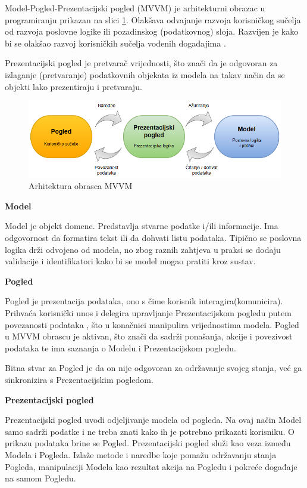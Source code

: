 \documentclass[times, utf8, diplomski]{fer}
\begin{document}
Model-Pogled-Prezentacijski pogled (MVVM) je arhitekturni obrazac u programiranju prikazan na slici \ref{fig:mvvm}. Olakšava odvajanje razvoja korisničkog sučelja od razvoja poslovne logike ili pozadinskog (podatkovnog) sloja. Razvijen je kako bi se olakšao razvoj korisničkih sučelja vođenih događajima . 

Prezentacijski pogled je pretvarač vrijednosti, što znači da je odgovoran za izlaganje (pretvaranje) podatkovnih objekata iz modela na takav način da se objekti lako prezentiraju i pretvaraju. \citep{mvvm}

\begin{figure}[htb]
\centering
\includegraphics[width=14cm]{mvvm.png}
\caption{Arhitektura obrasca MVVM}
\label{fig:mvvm}
\end{figure}


\textbf{Model}

Model je objekt domene. Predstavlja stvarne podatke i/ili informacije. Ima odgovornost da formatira tekst ili da dohvati listu podataka. Tipično se poslovna logika drži odvojeno od modela, no zbog raznih zahtjeva u praksi se dodaju validacije i identifikatori kako bi se model mogao pratiti kroz sustav. \citep{mvvm}


\hfill\break
\textbf{Pogled}

Pogled je prezentacija podataka, ono s čime korisnik interagira(komunicira). 
Prihvaća korisnički unos i delegira upravljanje Prezentacijskom pogledu putem povezanosti podataka , što u konačnici manipulira vrijednostima modela.
Pogled u MVVM obrascu je aktivan, što znači da sadrži ponašanja, akcije i povezivost podataka  te ima saznanja o Modelu i Prezentacijskom pogledu.

Bitna stvar za Pogled je da on nije odgovoran za održavanje svojeg stanja, već ga sinkronizira s Prezentacijskim pogledom. \citep{mvvm}


\hfill\break
\textbf{Prezentacijski pogled}

Prezentacijski pogled uvodi odjeljivanje modela od pogleda. Na ovaj način Model samo sadrži podatke i ne treba znati kako ih je potrebno prikazati korisniku. O prikazu podataka brine se Pogled. Prezentacijski pogled služi kao veza između Modela i Pogleda. Izlaže metode i naredbe koje pomažu održavanju stanja Pogleda, manipulaciji Modela kao rezultat akcija na Pogledu i pokreće događaje na samom Pogledu. \citep{mvvm}
\end{document}
